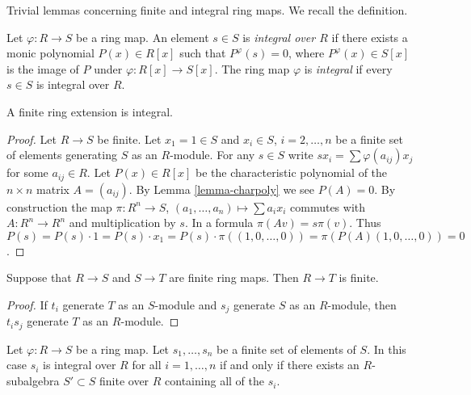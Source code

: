 \noindent
Trivial lemmas concerning finite and integral ring maps.
We recall the definition.

\begin{definition}
\label{definition-integral-ring-map}
Let $\varphi : R \to S$ be a ring map. An element $s \in S$
is {\it integral over $R$} if there exists a monic
polynomial $P(x) \in R[x]$ such that
$P^\varphi(s) = 0$, where $P^\varphi(x) \in S[x]$
is the image of $P$ under $\varphi : R[x] \to S[x]$.
The ring map $\varphi$ is {\it integral}
if every $s \in S$ is integral over $R$.
\end{definition}

\begin{lemma}
\label{lemma-finite-is-integral}
A finite ring extension is integral.
\end{lemma}

\begin{proof}
Let $R \to S$ be finite. Let $x_1 = 1 \in S$ and
$x_i \in S$, $i=2,\ldots,n$ be a finite set of
elements generating $S$ as an $R$-module.
For any $s\in S$ write $sx_i = \sum \varphi(a_{ij}) x_j$
for some $a_{ij} \in R$. Let $P(x) \in R[x]$ be
the characteristic polynomial of the $n\times n$ matrix
$A = (a_{ij})$. By Lemma \ref{lemma-charpoly} we see
$P(A) = 0$. By construction the map $\pi : R^n \to S$,
$(a_1,\ldots,a_n) \mapsto \sum a_i x_i$
commutes with $A : R^n \to R^n$ and
multiplication by $s$. In a formula
$\pi(Av) = s\pi(v)$. Thus $P(s) = P(s) \cdot 1
= P(s) \cdot x_1 = P(s) \cdot \pi((1,0,\ldots,0))
= \pi(P(A)(1,0,\ldots,0)) = 0$.
\end{proof}

\begin{lemma}
\label{lemma-finite-transitive}
Suppose that $R \to S$ and $S \to T$ are finite
ring maps. Then $R \to T$ is finite.
\end{lemma}

\begin{proof}
If $t_i$ generate $T$ as an $S$-module and $s_j$ generate $S$ as an
$R$-module, then $t_i s_j$ generate $T$ as an $R$-module.
\end{proof}

\begin{lemma}
\label{lemma-characterize-integral}
Let $\varphi : R \to S$ be a ring map. Let $s_1,\ldots,s_n$
be a finite set of elements of $S$.
In this case $s_i$ is integral over $R$ for all $i=1,\ldots,n$
if and only if
there exists an $R$-subalgebra $S' \subset S$ finite over $R$
containing all of the $s_i$.
\end{lemma}

